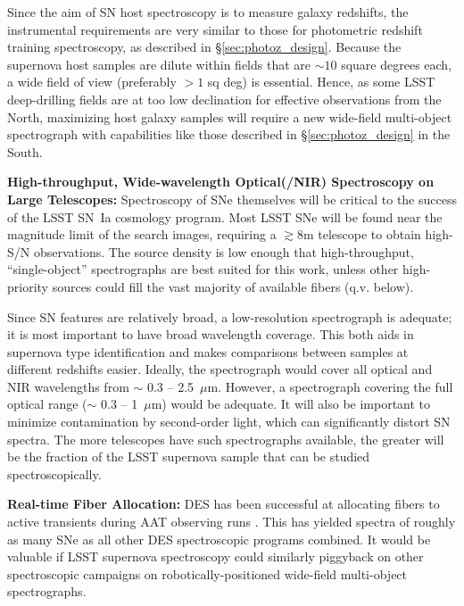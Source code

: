 Since the aim of SN host spectroscopy is to measure galaxy redshifts, the instrumental requirements are very similar to those for photometric redshift training spectroscopy, as described in \S \ref{sec:photoz_design}.  Because the supernova host samples are dilute within fields that are $\sim 10$ square degrees each, a wide field of view (preferably $>1$ sq deg) is essential.   Hence, as some LSST deep-drilling fields are at too low declination for effective observations from the North, maximizing host galaxy samples will require a new wide-field multi-object spectrograph with capabilities like those described in \S \ref{sec:photoz_design} in the South.


{\bf High-throughput, Wide-wavelength Optical(/NIR) Spectroscopy on Large Telescopes:}  Spectroscopy of SNe themselves will be critical to the success of the LSST
SN~Ia cosmology program.  Most LSST SNe will be found near the
magnitude limit of the search images, requiring a $\gtrsim$8m
telescope to obtain high-S/N observations.  The source density is low enough that high-throughput, ``single-object'' spectrographs are best suited for this work, unless other high-priority sources could fill the vast majority of available fibers (q.v. below).  

Since SN features are relatively broad, a low-resolution spectrograph
is adequate; it is most important to have broad wavelength coverage.  This both aids in
supernova type identification and
makes comparisons between samples at different redshifts easier.  Ideally, the spectrograph
would cover all optical and NIR wavelengths from $\sim$ 0.3 --
2.5~$\mu$m.  However, a spectrograph covering the full optical range
($\sim$ 0.3 -- 1~$\mu$m) would be adequate.   It will also be important to minimize contamination by second-order light, which can significantly distort SN spectra.  The more telescopes have such spectrographs available, the greater will be the fraction of the LSST supernova sample that can be studied spectroscopically.


{\bf Real-time Fiber Allocation:}  DES has been successful at allocating fibers to active transients
during AAT observing runs \citep{Yuan15}.  This has yielded spectra of roughly as
many SNe as all other DES spectroscopic programs combined.  It would be valuable if LSST supernova spectroscopy could similarly piggyback on other spectroscopic campaigns on robotically-positioned wide-field multi-object spectrographs.  



